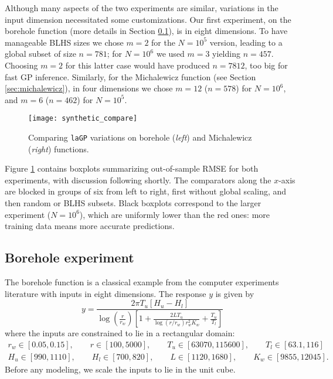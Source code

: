 \documentclass[12pt]{article}
\begin{document}
Although many aspects of the two experiments are similar, variations in the
input dimension necessitated some customizations. Our first experiment, on the
borehole function (more details in Section \ref{sec:borehole}), is in eight dimensions.
To have manageable BLHS sizes we chose $m=2$ for the
$N=10^5$ version, leading to a global subset of size $n=781$; for
$N=10^6$ we used $m=3$ yielding $n=457$.  Choosing $m=2$ for this latter
case would have produced $n=7812$, too big for fast GP inference.
Similarly, for the Michalewicz function (see Section \ref{sec:michalewicz}),
in four dimensions we chose $m=12$ ($n=578$) for $N=10^6$, and $m=6$
($n=462$) for $N=10^5$.

\begin{figure}[ht!]
\centering
\texttt{[image: synthetic\_compare]}
\vspace{-0.25cm}
\caption{Comparing {\tt laGP} variations on  
borehole ({\em left}) and Michalewicz ({\em right}) functions.}
\label{f:synthetic_compare}
\end{figure}

Figure \ref{f:synthetic_compare} contains boxplots summarizing out-of-sample
RMSE for both experiments, with discussion following shortly. The comparators
along the $x$-axis are blocked in groups of six from left to right, first
without global scaling, and then random or BLHS subsets.  Black boxplots
correspond to the larger experiment ($N=10^6$), which are uniformly lower than
the red ones: more training data means more accurate predictions.

\subsection{Borehole experiment}
\label{sec:borehole}

The borehole function is a classical example from the computer experiments
literature \citep{morris:mitchell:ylvisaker:1993} with inputs in eight dimensions.  The
response $y$ is given by
$$
y=\frac{2\pi T_u\left[H_u-H_l \right]}{
\log\left(\frac{r}{r_w}\right)\left[1+\frac{2LT_u}{\log\left(r/r_w\right)r^2_wK_w}+\frac{T_u}{T_l} \right]}
$$  
where the inputs are constrained to lie in a rectangular domain:
\begin{align*}
r_w\in [0.05, 0.15],\qquad  r\in[100, 5000],\qquad  T_u\in [63070, 115600],\qquad  T_l\in[63.1, 116] \\
H_u\in [990, 1110],\qquad  H_l\in[700, 820],\qquad  L\in[1120, 1680],\qquad  K_w\in[9855, 12045].
\end{align*}
Before any modeling, we scale the inputs to lie in the unit cube.  
\end{document}
